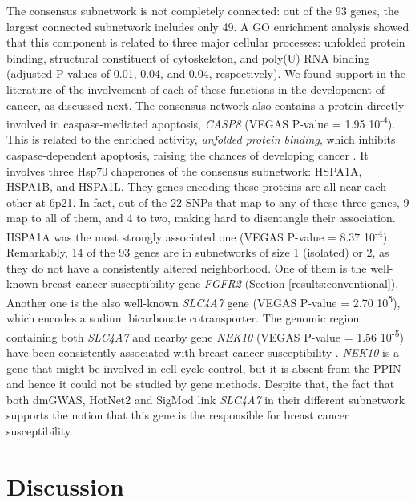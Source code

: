 \documentclass[twocolumn, 10pt]{article}
\begin{document}
The consensus subnetwork is not completely connected: out of the 93 genes, the largest connected subnetwork includes only 49. A GO enrichment analysis showed that this component is related to three major cellular processes: unfolded protein binding, structural constituent of cytoskeleton, and poly(U) RNA binding (adjusted P-values of 0.01, 0.04, and 0.04, respectively). We found support in the literature of the involvement of each of these functions in the development of cancer, as discussed next. The consensus network also contains a protein directly involved in caspase-mediated apoptosis, \emph{CASP8} (VEGAS P-value = 1.95 \texttimes{} 10\textsuperscript{-4}). This is related to the enriched activity, \emph{unfolded protein binding}, which inhibits caspase-dependent apoptosis, raising the chances of developing cancer \cite{calderwood_heat_2016}. It involves three Hsp70 chaperones of the consensus subnetwork: HSPA1A, HSPA1B, and HSPA1L. They genes encoding these proteins are all near each other at 6p21. In fact, out of the 22 SNPs that map to any of these three genes, 9 map to all of them, and 4 to two, making hard to disentangle their association. HSPA1A was the most strongly associated one (VEGAS P-value = 8.37 \texttimes{} 10\textsuperscript{-4}). Remarkably, 14 of the 93 genes are in subnetworks of size 1 (isolated) or 2, as they do not have a consistently altered neighborhood. One of them is the well-known breast cancer susceptibility gene \emph{FGFR2} (Section \ref{results:conventional}). Another one is the also well-known \emph{SLC4A7} gene (VEGAS P-value = 2.70 \texttimes{} 10\textsuperscript{5}), which encodes a sodium bicarbonate cotransporter. The genomic region containing both \emph{SLC4A7} and nearby gene \emph{NEK10} (VEGAS P-value = 1.56 \texttimes{} 10\textsuperscript{-5}) have been consistently associated with breast cancer susceptibility \cite{ahmed_newly_2009}. \emph{NEK10} is a gene that might be involved in cell-cycle control, but it is absent from the PPIN and hence it could not be studied by gene methods. Despite that, the fact that both dmGWAS, HotNet2 and SigMod link \emph{SLC4A7} in their different subnetwork supports the notion that this gene is the responsible for breast cancer susceptibility. 

\section{Discussion}
\label{sec:orgbfa6dab}
\end{document}
